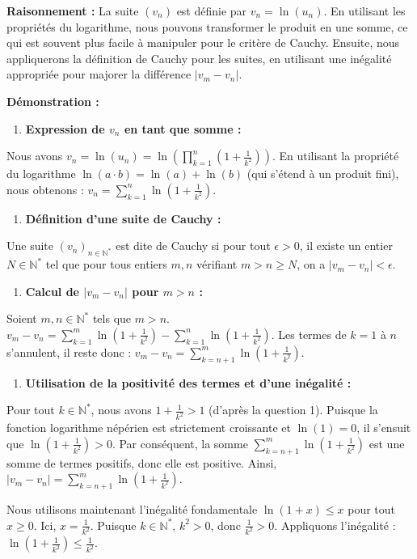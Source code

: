 \documentclass[a4paper,11pt]{report}
\begin{document}
\textbf{Raisonnement :}
La suite $(v_n)$ est définie par $v_n = \ln(u_n)$. En utilisant les propriétés du logarithme, nous pouvons transformer le produit en une somme, ce qui est souvent plus facile à manipuler pour le critère de Cauchy. Ensuite, nous appliquerons la définition de Cauchy pour les suites, en utilisant une inégalité appropriée pour majorer la différence $|v_m - v_n|$.

\textbf{Démonstration :}
\begin{enumerate}
\item \textbf{Expression de $v_n$ en tant que somme :}
\end{enumerate}
    Nous avons $v_n = \ln(u_n) = \ln\left(\prod_{k=1}^n \left(1 + \frac{1}{k^2}\right)\right)$.
    En utilisant la propriété du logarithme $\ln(a \cdot b) = \ln(a) + \ln(b)$ (qui s'étend à un produit fini), nous obtenons :
    $v_n = \sum_{k=1}^n \ln\left(1 + \frac{1}{k^2}\right)$.
\begin{enumerate}
\item \textbf{Définition d'une suite de Cauchy :}
\end{enumerate}
    Une suite $(v_n)_{n \in \mathbb{N}^*}$ est dite de Cauchy si pour tout $\epsilon > 0$, il existe un entier $N \in \mathbb{N}^*$ tel que pour tous entiers $m, n$ vérifiant $m > n \ge N$, on a $|v_m - v_n| < \epsilon$.
\begin{enumerate}
\item \textbf{Calcul de $|v_m - v_n|$ pour $m > n$ :}
\end{enumerate}
    Soient $m, n \in \mathbb{N}^*$ tels que $m > n$.
    $v_m - v_n = \sum_{k=1}^m \ln\left(1 + \frac{1}{k^2}\right) - \sum_{k=1}^n \ln\left(1 + \frac{1}{k^2}\right)$.
    Les termes de $k=1$ à $n$ s'annulent, il reste donc :
    $v_m - v_n = \sum_{k=n+1}^m \ln\left(1 + \frac{1}{k^2}\right)$.
\begin{enumerate}
\item \textbf{Utilisation de la positivité des termes et d'une inégalité :}
\end{enumerate}
    Pour tout $k \in \mathbb{N}^*$, nous avons $1 + \frac{1}{k^2} > 1$ (d'après la question 1).
    Puisque la fonction logarithme népérien est strictement croissante et $\ln(1)=0$, il s'ensuit que $\ln\left(1 + \frac{1}{k^2}\right) > 0$.
    Par conséquent, la somme $\sum_{k=n+1}^m \ln\left(1 + \frac{1}{k^2}\right)$ est une somme de termes positifs, donc elle est positive.
    Ainsi, $|v_m - v_n| = \sum_{k=n+1}^m \ln\left(1 + \frac{1}{k^2}\right)$.

    Nous utilisons maintenant l'inégalité fondamentale $\ln(1+x) \le x$ pour tout $x \ge 0$.
    Ici, $x = \frac{1}{k^2}$. Puisque $k \in \mathbb{N}^*$, $k^2 > 0$, donc $\frac{1}{k^2} > 0$.
    Appliquons l'inégalité : $\ln\left(1 + \frac{1}{k^2}\right) \le \frac{1}{k^2}$.
\end{document}
